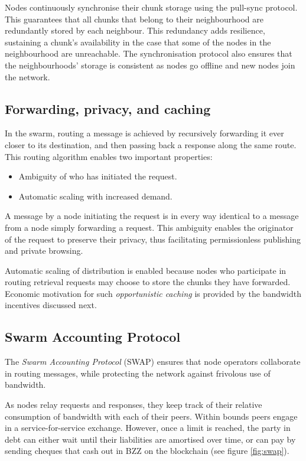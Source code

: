 \documentclass[12pt,a4paper]{article}
\begin{document}
Nodes continuously synchronise their chunk storage using the pull-sync protocol. This guarantees that all chunks that belong to their neighbourhood are redundantly stored by each neighbour. This redundancy adds resilience, sustaining a chunk's availability in the case that some of the nodes in the neighbourhood are unreachable. The synchronisation protocol also ensures that the neighbourhoods' storage is consistent as nodes go offline and new nodes join the network. 

\subsection{Forwarding, privacy, and caching}

In the swarm, routing a message is achieved by recursively forwarding it ever closer to its destination, and then passing back a response along the same route. This routing algorithm enables two important properties:

\begin{itemize}
    \item Ambiguity of who has initiated the request.
    \item Automatic scaling with increased demand.
\end{itemize}

A message by a node initiating the request is in every way identical to a message from a node simply forwarding a request. This ambiguity enables the originator of the request to preserve their privacy, thus facilitating permissionless publishing and private browsing.

Automatic scaling of distribution is enabled because nodes who participate in routing retrieval requests may choose to store the chunks they have forwarded. Economic motivation for such \emph{opportunistic caching} is provided by the bandwidth incentives discussed next.

\subsection{Swarm Accounting Protocol}

The \emph{Swarm Accounting Protocol} (SWAP) ensures that node operators collaborate in routing messages, while protecting the network against frivolous use of bandwidth.

As nodes relay requests and responses, they keep track of their relative consumption of bandwidth with each of their peers. Within bounds peers engage in a service-for-service exchange.
However, once a limit is reached, the party in debt can either wait until their liabilities are amortised over time, or can pay by sending cheques that cash out in BZZ on the blockchain (see figure \ref{fig:swap}).
\end{document}
